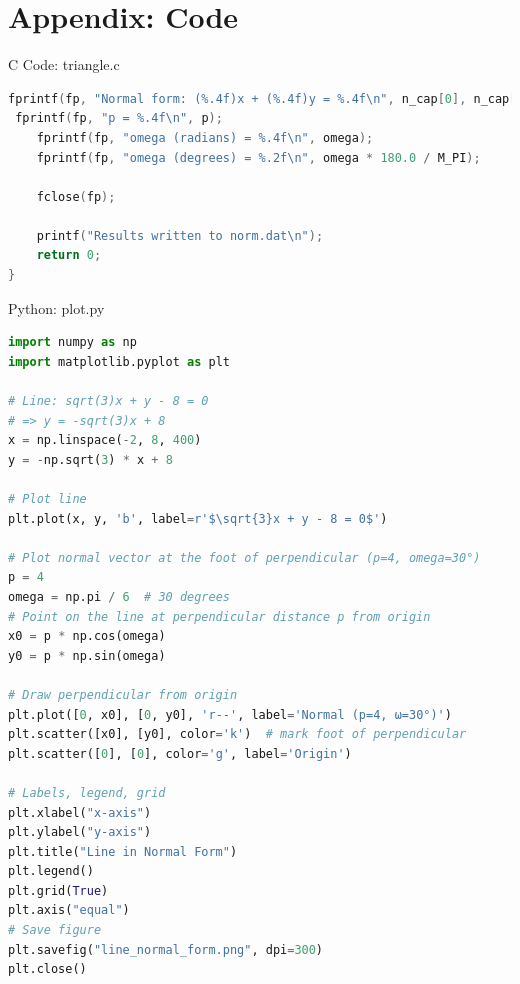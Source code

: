 \documentclass{beamer}
\numberwithin{equation}{section}
\theoremstyle{remark}
\begin{document}
\section*{Appendix: Code}

\begin{frame}[fragile]{C Code: triangle.c}
\begin{lstlisting}[language=C]
 fprintf(fp, "Normal form: (%.4f)x + (%.4f)y = %.4f\n", n_cap[0], n_cap[1], p);
 fprintf(fp, "p = %.4f\n", p);
    fprintf(fp, "omega (radians) = %.4f\n", omega);
    fprintf(fp, "omega (degrees) = %.2f\n", omega * 180.0 / M_PI);

    fclose(fp);

    printf("Results written to norm.dat\n");
    return 0;
}
\end{lstlisting}
\end{frame}

\begin{frame}[fragile]{Python: plot.py}
\begin{lstlisting}[language=Python]
 import numpy as np
import matplotlib.pyplot as plt

# Line: sqrt(3)x + y - 8 = 0
# => y = -sqrt(3)x + 8
x = np.linspace(-2, 8, 400)
y = -np.sqrt(3) * x + 8

# Plot line
plt.plot(x, y, 'b', label=r'$\sqrt{3}x + y - 8 = 0$')

# Plot normal vector at the foot of perpendicular (p=4, omega=30°)
p = 4
omega = np.pi / 6  # 30 degrees
# Point on the line at perpendicular distance p from origin
x0 = p * np.cos(omega)
y0 = p * np.sin(omega)

# Draw perpendicular from origin
plt.plot([0, x0], [0, y0], 'r--', label='Normal (p=4, ω=30°)')
plt.scatter([x0], [y0], color='k')  # mark foot of perpendicular
plt.scatter([0], [0], color='g', label='Origin')

# Labels, legend, grid
plt.xlabel("x-axis")
plt.ylabel("y-axis")
plt.title("Line in Normal Form")
plt.legend()
plt.grid(True)
plt.axis("equal")
# Save figure
plt.savefig("line_normal_form.png", dpi=300)
plt.close()
\end{lstlisting}
\end{frame} 
\end{document}
